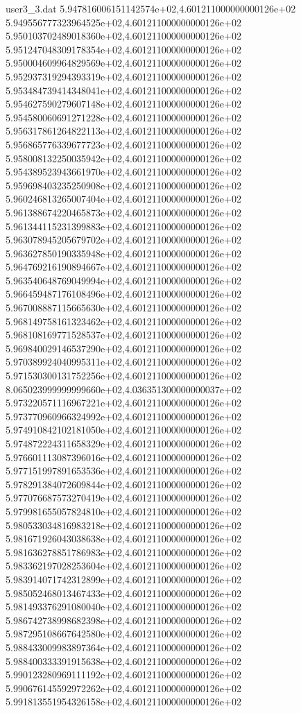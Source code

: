 \begin{filecontents}{user3_3.dat}
5.947816006151142574e+02,4.601211000000000126e+02
5.949556777323964525e+02,4.601211000000000126e+02
5.950103702489018360e+02,4.601211000000000126e+02
5.951247048309178354e+02,4.601211000000000126e+02
5.950004609964829569e+02,4.601211000000000126e+02
5.952937319294393319e+02,4.601211000000000126e+02
5.953484739414348041e+02,4.601211000000000126e+02
5.954627590279607148e+02,4.601211000000000126e+02
5.954580060691271228e+02,4.601211000000000126e+02
5.956317861264822113e+02,4.601211000000000126e+02
5.956865776339677723e+02,4.601211000000000126e+02
5.958008132250035942e+02,4.601211000000000126e+02
5.954389523943661970e+02,4.601211000000000126e+02
5.959698403235250908e+02,4.601211000000000126e+02
5.960246813265007404e+02,4.601211000000000126e+02
5.961388674220465873e+02,4.601211000000000126e+02
5.961344115231399883e+02,4.601211000000000126e+02
5.963078945205679702e+02,4.601211000000000126e+02
5.963627850190335948e+02,4.601211000000000126e+02
5.964769216190894667e+02,4.601211000000000126e+02
5.963540648769049994e+02,4.601211000000000126e+02
5.966459487176108496e+02,4.601211000000000126e+02
5.967008887115665630e+02,4.601211000000000126e+02
5.968149758161323462e+02,4.601211000000000126e+02
5.968108169771528537e+02,4.601211000000000126e+02
5.969840029146537290e+02,4.601211000000000126e+02
5.970389924040995311e+02,4.601211000000000126e+02
5.971530300131752256e+02,4.601211000000000126e+02
8.065023999999999660e+02,4.036351300000000037e+02
5.973220571116967221e+02,4.601211000000000126e+02
5.973770960966324992e+02,4.601211000000000126e+02
5.974910842102181050e+02,4.601211000000000126e+02
5.974872224311658329e+02,4.601211000000000126e+02
5.976601113087396016e+02,4.601211000000000126e+02
5.977151997891653536e+02,4.601211000000000126e+02
5.978291384072609844e+02,4.601211000000000126e+02
5.977076687573270419e+02,4.601211000000000126e+02
5.979981655057824810e+02,4.601211000000000126e+02
5.980533034816983218e+02,4.601211000000000126e+02
5.981671926043038638e+02,4.601211000000000126e+02
5.981636278851786983e+02,4.601211000000000126e+02
5.983362197028253604e+02,4.601211000000000126e+02
5.983914071742312899e+02,4.601211000000000126e+02
5.985052468013467433e+02,4.601211000000000126e+02
5.981493376291080040e+02,4.601211000000000126e+02
5.986742738998682398e+02,4.601211000000000126e+02
5.987295108667642580e+02,4.601211000000000126e+02
5.988433009983897364e+02,4.601211000000000126e+02
5.988400333391915638e+02,4.601211000000000126e+02
5.990123280969111192e+02,4.601211000000000126e+02
5.990676145592972262e+02,4.601211000000000126e+02
5.991813551954326158e+02,4.601211000000000126e+02

\end{filecontents}
